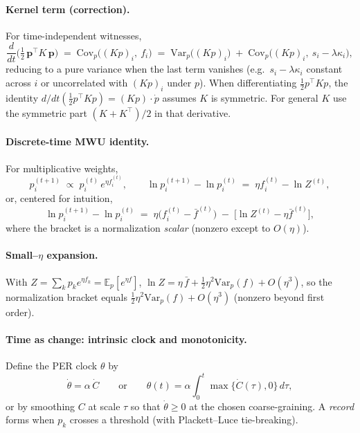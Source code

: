 \documentclass[11pt]{article}
\newcommand{\p}{\bm{p}}
\begin{document}
\paragraph{Kernel term (correction).}
For time-independent witnesses,
\begin{equation}
 \frac{d}{dt}\Big(\tfrac12\,\p^\top K\,\p\Big)
 \;=\; \mathrm{Cov}_p\!\Big((Kp)_i,\ f_i\Big)
 \;=\; \mathrm{Var}_p\!\big((Kp)_i\big) \;+\; \mathrm{Cov}_p\!\Big((Kp)_i,\ s_i-\lambda\kappa_i\Big),
\end{equation}
reducing to a pure variance when the last term vanishes (e.g.\ $s_i-\lambda\kappa_i$ constant across $i$ or uncorrelated with $(Kp)_i$ under $p$).
When differentiating $\tfrac12 p^\top K p$, the identity $d/dt(\tfrac12 p^\top K p)=(Kp)\!\cdot\dot p$ assumes $K$ is symmetric.
For general $K$ use the symmetric part $(K+K^\top)/2$ in that derivative.


\paragraph{Discrete-time MWU identity.}
For multiplicative weights,
\begin{equation}
  p_i^{(t+1)} \;\propto\; p_i^{(t)}\,e^{\eta f_i^{(t)}},\qquad
  \ln p_i^{(t+1)} - \ln p_i^{(t)} \;=\; \eta f_i^{(t)} - \ln Z^{(t)},
\end{equation}
or, centered for intuition,
\begin{equation}
  \ln p_i^{(t+1)} - \ln p_i^{(t)} \;=\; \eta\big(f_i^{(t)}-\bar f^{(t)}\big)\;-\;\big[\ln Z^{(t)}-\eta\bar f^{(t)}\big],
\end{equation}
where the bracket is a normalization \emph{scalar} (nonzero except to $O(\eta)$).

\paragraph{Small–$\eta$ expansion.}
With $Z=\sum_k p_k e^{\eta f_k}=\mathbb{E}_p[e^{\eta f}]$, 
$\ln Z=\eta\,\bar f+\tfrac12\eta^2\mathrm{Var}_p(f)+O(\eta^3)$,
so the normalization bracket equals $\tfrac12\eta^2\mathrm{Var}_p(f)+O(\eta^3)$ (nonzero beyond first order).


\paragraph{Time as change: intrinsic clock and monotonicity.}
Define the PER clock $\theta$ by
\begin{equation}
  \dot\theta = \alpha\,\dot C \qquad \text{or} \qquad
  \theta(t)=\alpha\!\int_0^t\!\max\{\dot C(\tau),0\}\,d\tau,
\end{equation}
or by smoothing $C$ at scale $\tau$ so that $\dot\theta\ge 0$ at the chosen coarse-graining.
A \emph{record} forms when $p_k$ crosses a threshold (with Plackett--Luce tie-breaking).
\end{document}
